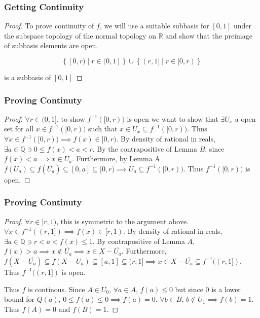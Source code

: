\documentclass{beamer}
\newcommand*{\subeq}{\subseteq}
\newcommand{\R}{\mathbb{R}}
\newcommand{\Q}{\mathbb{Q}}
\begin{document}
\begin{frame}
    \frametitle{Getting Continuity}

    \begin{proof}
        \renewcommand{\qedsymbol}{}

        To prove continuity of $f$, we will use a suitable subbasis for $[0, 1]$ under the subspace topology of the normal topology on $\R$ and show that the preimage of subbasis elements are open.
        
        \begin{equation*}
            \left\{ [0, r) \mid r \in (0, 1] \right\} \cup \left\{ (r, 1] \mid r \in [0, r) \right\} 
        \end{equation*}

        is a subbasis of $[0,1]$ 
    \end{proof}

\end{frame}

\begin{frame}
    \frametitle{Proving Continuty}

    \begin{proof}
        \renewcommand{\qedsymbol}{}

        $\forall r \in (0, 1]$, to show $f^{-1}([0, r))$ is open we want to show that $\exists U_x$ a open set for all $x \in f^{-1}([0, r))$ such that $x \in U_x \subeq f^{-1}([0, r))$. Thus $\forall x \in f^{-1}([0, r)) \implies f(x) \in [0, r)$. By density of rational in reals, $\exists a \in \Q \ni 0 \leq f(x) < a < r$. By the contrapositive of Lemma $B$, since $f(x) < a \implies x \in U_a$. Furthermore, by Lemma A $f(U_a) \subeq f(\overline{U_a}) \subeq [0, a] \subeq [0, r) \implies U_a \subeq f^{-1}([0, r))$. Thus $f^{-1}([0, r))$ is open.             
    \end{proof}

\end{frame}

\begin{frame}
    \frametitle{Proving Continuty}

    \begin{proof}

        $\forall r \in [r, 1)$, this is symmetric to the argument above. $\forall x \in f^{-1}((r, 1]) \implies f(x) \in [r, 1)$. By density of rational in reals, $\exists a \in \Q \ni r < a < f(x) \leq 1$. By contrapositive of Lemma $A$, $f(x) > a \implies x \not \in \overline{U_a} \implies x \in X - \overline{U_a}$. Furthermore, $f(X - \overline{U_a}) \subeq f(X - U_a) \subeq [a, 1] \subeq (r, 1] \implies x \in X - \overline{U_a} \subeq f^{-1}((r, 1])$. Thus $f^{-1}((r, 1])$ is open.
        
        Thus $f$ is continous. Since $A \in U_0$, $\forall a \in A$, $f(a) \leq 0$ but since $0$ is a lower bound for $Q(a)$, $0 \leq f(a) \leq 0 \implies f(a) = 0$. $\forall b \in B$, $b \not\in U_1 \implies f(b) = 1$. Thus $f(A) = 0$ and $f(B) = 1$.              
    \end{proof}

\end{frame}
\end{document}
